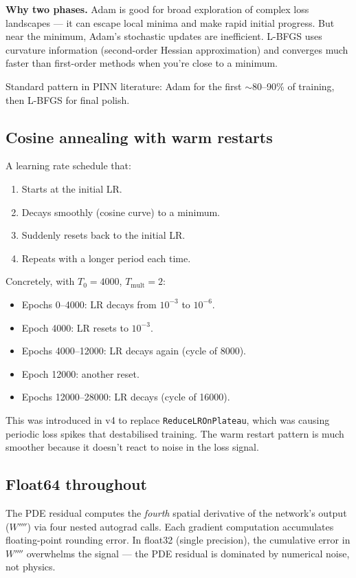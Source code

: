 \documentclass[11pt,a4paper]{article}
\begin{document}
\textbf{Why two phases.} Adam is good for broad exploration of complex loss landscapes --- it can escape local minima and make rapid initial progress. But near the minimum, Adam's stochastic updates are inefficient. L-BFGS uses curvature information (second-order Hessian approximation) and converges much faster than first-order methods when you're close to a minimum.

Standard pattern in PINN literature: Adam for the first $\sim$80--90\% of training, then L-BFGS for final polish.

\subsection{Cosine annealing with warm restarts}

A learning rate schedule that:
\begin{enumerate}[leftmargin=*, itemsep=2pt]
\item Starts at the initial LR.
\item Decays smoothly (cosine curve) to a minimum.
\item Suddenly resets back to the initial LR.
\item Repeats with a longer period each time.
\end{enumerate}
Concretely, with $T_0 = 4000$, $T_\text{mult} = 2$:
\begin{itemize}[leftmargin=*, itemsep=2pt]
\item Epochs 0--4000: LR decays from $10^{-3}$ to $10^{-6}$.
\item Epoch 4000: LR resets to $10^{-3}$.
\item Epochs 4000--12000: LR decays again (cycle of 8000).
\item Epoch 12000: another reset.
\item Epochs 12000--28000: LR decays (cycle of 16000).
\end{itemize}
This was introduced in v4 to replace \texttt{ReduceLROnPlateau}, which was causing periodic loss spikes that destabilised training. The warm restart pattern is much smoother because it doesn't react to noise in the loss signal.

\subsection{Float64 throughout}

The PDE residual computes the \emph{fourth} spatial derivative of the network's output ($W''''$) via four nested autograd calls. Each gradient computation accumulates floating-point rounding error. In float32 (single precision), the cumulative error in $W''''$ overwhelms the signal --- the PDE residual is dominated by numerical noise, not physics.
\end{document}
